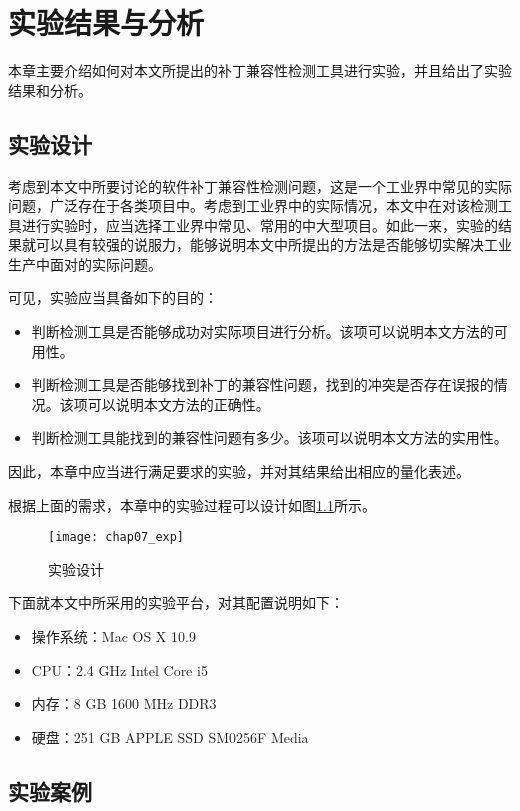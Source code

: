 \chapter{实验结果与分析}
\label {exp}
本章主要介绍如何对本文所提出的补丁兼容性检测工具进行实验，并且给出了实验结果和分析。

\section{实验设计}
\label {exp_des}

考虑到本文中所要讨论的软件补丁兼容性检测问题，这是一个工业界中常见的实际问题，广泛存在于各类项目中。考虑到工业界中的实际情况，本文中在对该检测工具进行实验时，应当选择工业界中常见、常用的中大型项目。如此一来，实验的结果就可以具有较强的说服力，能够说明本文中所提出的方法是否能够切实解决工业生产中面对的实际问题。

可见，实验应当具备如下的目的：
\begin{itemize}
	\item 判断检测工具是否能够成功对实际项目进行分析。该项可以说明本文方法的可用性。
	\item 判断检测工具是否能够找到补丁的兼容性问题，找到的冲突是否存在误报的情况。该项可以说明本文方法的正确性。
	\item 判断检测工具能找到的兼容性问题有多少。该项可以说明本文方法的实用性。
\end{itemize}

因此，本章中应当进行满足要求的实验，并对其结果给出相应的量化表述。

根据上面的需求，本章中的实验过程可以设计如图\ref {des_exp}所示。

\begin{figure}[H]
	\centering
	\texttt{[image: chap07\_exp]}
	\caption {实验设计}
	\label {des_exp}	
\end{figure}


下面就本文中所采用的实验平台，对其配置说明如下：
\begin{itemize}
	\item 操作系统：Mac OS X 10.9
	\item CPU：2.4 GHz Intel Core i5
	\item 内存：8 GB 1600 MHz DDR3
	\item 硬盘：251 GB APPLE SSD SM0256F Media
\end{itemize}

\section{实验案例}
\label {exp_data}

